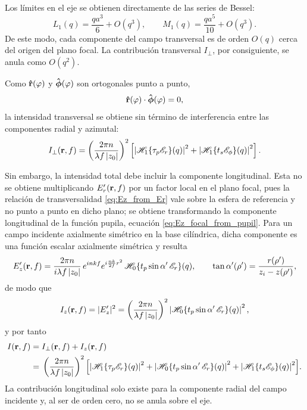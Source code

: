 Los límites en el eje se obtienen directamente de las series de Bessel:
\begin{equation}
  L_1(q)
  =
  \frac{qa^3}{6}
  +
  O(q^3),
  \qquad
  M_1(q)
  =
  \frac{qa^5}{10}
  +
  O(q^3).
  \label{eq:L1_M1_small_q}
\end{equation}
De este modo, cada componente del campo transversal es de orden \(O(q)\) cerca del origen del plano focal. La contribución transversal \(I_\perp\), por consiguiente, se anula como \(O(q^2)\).

Como \(\bm{\hat{\mathbf{r}}}(\varphi)\) y \(\bm{\hat{\mathbf{\phi}}}(\varphi)\) son ortogonales punto a punto,
\begin{equation}
  \bm{\hat{\mathbf{r}}}(\varphi)\cdot\bm{\hat{\mathbf{\phi}}}(\varphi)=0,
\end{equation}
la intensidad transversal se obtiene sin término de interferencia entre las componentes radial y azimutal:
\begin{equation}
  I_\perp(\vb r,f)
  =
  \left(
  \frac{2\pi n}{\lambda f\,|z_0|}
  \right)^2
  \left[
  \left|
  \mathscr H_1\{\tau_p\mathscr E_r\}(q)
  \right|^2
  +
  \left|
  \mathscr H_1\{t_s\mathscr E_\phi\}(q)
  \right|^2
  \right].
\label{eq:I_perp_cylindrical}
\end{equation}

Sin embargo, la intensidad total debe incluir la componente longitudinal. Esta no se obtiene multiplicando $E'_r(\vb r,f)$ por un factor local en el plano focal, pues la relación de transversalidad \eqref{eq:Ez_from_Er} vale sobre la esfera de referencia y no punto a punto en dicho plano; se obtiene transformando la componente longitudinal de la función pupila, ecuación \eqref{eq:Ez_focal_from_pupil}. Para un campo incidente axialmente simétrico en la base cilíndrica, dicha componente es una función escalar axialmente simétrica y resulta
\begin{equation}
E'_z(\vb r,f)
=
\frac{2\pi n}{i\lambda f\,|z_0|}\,e^{inkf}e^{i\frac{nk}{2f}r^2}\,
\mathscr H_0\{t_p\sin\alpha'\,\mathscr E_r\}(q),
\qquad
\tan\alpha'(\rho')=\frac{r(\rho')}{z_i-z(\rho')},
\label{eq:Ez_from_Er_cylindrical}
\end{equation}
de modo que
\begin{equation}
I_z(\vb r,f)=|E'_z|^2
=
\left(
\frac{2\pi n}{\lambda f\,|z_0|}
\right)^2
\left|
\mathscr H_0\{t_p\sin\alpha'\,\mathscr E_r\}(q)
\right|^2,
\label{eq:Iz_cylindrical}
\end{equation}
y por tanto
\begin{equation}
\begin{aligned}
I(\vb r,f)={}&I_\perp(\vb r,f)+I_z(\vb r,f)
\\
={}&
\left(
\frac{2\pi n}{\lambda f\,|z_0|}
\right)^2
\Bigl[
\left|
\mathscr H_1\{\tau_p\mathscr E_r\}(q)
\right|^2
+
\left|
\mathscr H_0\{t_p\sin\alpha'\,\mathscr E_r\}(q)
\right|^2
+
\left|
\mathscr H_1\{t_s\mathscr E_\phi\}(q)
\right|^2
\Bigr].
\end{aligned}
\label{eq:I_total_cylindrical}
\end{equation}
La contribución longitudinal solo existe para la componente radial del campo incidente y, al ser de orden cero, no se anula sobre el eje.

